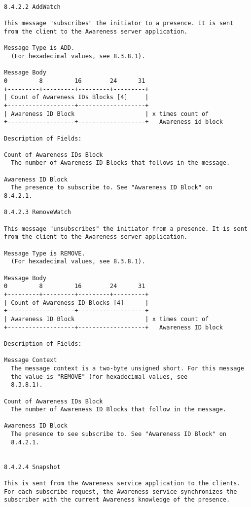 \documentclass[titlepage,oneside]{book}
\begin{document}
\begin{verbatim}
8.4.2.2 AddWatch

This message "subscribes" the initiator to a presence. It is sent
from the client to the Awareness server application.

Message Type is ADD.
  (For hexadecimal values, see 8.3.8.1).

Message Body
0         8         16        24      31
+---------+---------+---------+---------+
| Count of Awareness IDs Blocks [4]     |
+-------------------+-------------------+
| Awareness ID Block                    | x times count of
+-------------------+-------------------+   Awareness id block

Description of Fields:

Count of Awareness IDs Block
  The number of Awareness ID Blocks that follows in the message.

Awareness ID Block
  The presence to subscribe to. See "Awareness ID Block" on
8.4.2.1.

8.4.2.3 RemoveWatch

This message "unsubscribes" the initiator from a presence. It is sent 
from the client to the Awareness server application.

Message Type is REMOVE.
  (For hexadecimal values, see 8.3.8.1).

Message Body
0         8         16        24      31
+---------+---------+---------+---------+
| Count of Awareness ID Blocks [4]      |
+-------------------+-------------------+
| Awareness ID Block                    | x times count of
+-------------------+-------------------+   Awareness ID block

Description of Fields:

Message Context
  The message context is a two-byte unsigned short. For this message 
  the value is "REMOVE" (for hexadecimal values, see 
  8.3.8.1).

Count of Awareness IDs Block
  The number of Awareness ID Blocks that follow in the message.

Awareness ID Block
  The presence to see subscribe to. See "Awareness ID Block" on
  8.4.2.1.


8.4.2.4 Snapshot

This is sent from the Awareness service application to the clients.
For each subscribe request, the Awareness service synchronizes the
subscriber with the current Awareness knowledge of the presence.


\end{verbatim}
\end{document}
